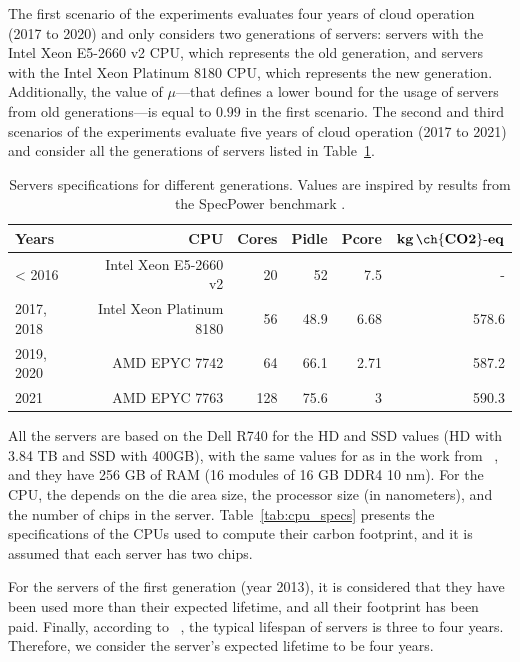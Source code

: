 The first scenario of the experiments evaluates four years of cloud operation (2017 to 2020) and only considers two generations of servers: servers with the Intel Xeon E5-2660 v2 CPU, which represents the old generation, and servers with the Intel Xeon Platinum 8180 CPU, which represents the new generation. Additionally, the value of $\mu$---that defines a lower bound for the usage of servers from old generations---is equal to $0.99$ in the first scenario. The second and third scenarios of the experiments evaluate five years of cloud operation (2017 to 2021) and consider all the generations of servers listed in Table~\ref{tab:servers_specs}.


\begin{table}[h]
  \small
  \caption{Servers specifications for different generations. Values are inspired by results from the SpecPower benchmark \cite{spec_2014,spec_2017,spec_2016,spec_2019,spec_2021}.} \centering
  \label{tab:servers_specs} 
  \begin{tabular}{|l|r|r|r|r|r|}
  \hline    
  \textbf{Years} & \textbf{CPU} &   \textbf{Cores} & \textbf{Pidle}  & \textbf{Pcore}  & \textbf{$\mathbf{kg\,\ch{CO2}\text{-}eq}$}  \\
  \hline
  < 2016      & Intel Xeon E5-2660 v2 & 20 & 52 & 7.5  & -   \\
  \hline
  2017, 2018  & Intel Xeon Platinum 8180 & 56 & 48.9 & 6.68  & 578.6   \\
  \hline
  2019, 2020   & AMD EPYC 7742  & 64 & 66.1 & 2.71  & 587.2 \\
  \hline
  2021        & AMD EPYC 7763 & 128 & 75.6 & 3     & 590.3 \\
  \hline
\end{tabular}  
\end{table}

All the servers are based on the Dell R740 for the HD and SSD values (HD with 3.84 TB and SSD with 400GB), with the same values for  as in the work from ~\citet{gupta2022_ACT}, and they have 256 GB of RAM (16 modules of 16 GB DDR4 10 nm). For the CPU, the  depends on the die area size, the processor size (in nanometers), and the number of chips in the server. Table~\ref{tab:cpu_specs} presents the specifications of the CPUs used to compute their carbon footprint, and it is assumed that each server has two chips. 


For the servers of the first generation (year 2013), it is considered that they have been used more than their expected lifetime, and all their  footprint has been paid. Finally, according to ~\citet{datacenter_as_computer}, the typical lifespan of servers is three to four years. Therefore, we consider the server's expected lifetime to be four years.

